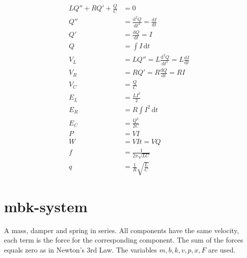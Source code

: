 \documentclass[]{elementary-physics}
\begin{document}
\begin{subequations}
\begin{align}
L Q'' + R Q' + \frac{Q}{C} &= 0 \\
Q'' &= \frac{\mathrm{d}^2 Q}{\mathrm{d}t^2} = \frac{\mathrm{d}I}{\mathrm{d}t} \\
Q' &= \frac{\mathrm{d}Q}{\mathrm{d}t} = I \tag{definition of current} \\
Q &= \int I \, \mathrm{d}t \\
V_L &= L Q'' = L \frac{\mathrm{d}^2 Q}{\mathrm{d}t^2} = L \frac{\mathrm{d}I}{\mathrm{d}t} \\
V_R &= R Q' = R \frac{\mathrm{d}Q}{\mathrm{d}t} = R I \tag{Ohm's law} \\
V_C &= \frac{Q}{C} \tag{definition of capacitance} \\
E_L &= \frac{L I^2}{2} \tag{energy in a coil} \\
E_R &= R \int I^2 \, \mathrm{d}t \tag{losses} \\
E_C &= \frac{Q^2}{2 C} \tag{energy in a capacitor} \\
P &= V I \tag{power} \\
W &= V I t = V Q \tag{work} \\
f &= \frac{1}{2 \pi \sqrt{L C}} \tag{frequency} \\
q &= \frac{1}{R} \sqrt{\frac{L}{C}} \tag{quality factor}
\end{align}
\end{subequations}

\pagebreak

\section{mbk-system}

A mass, damper and spring in series.
All components have the same velocity, each term is the force for the corresponding component.
The sum of the forces equals zero as in Newton's 3rd Law.
The variables $m,b,k,v,p,x,F$ are used.
\end{document}
